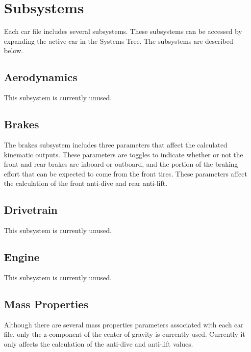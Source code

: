 \section{Subsystems} \label{sec:subsystems}

Each car file includes several subsystems.  These subsystems can be accessed by expanding the active car in the Systems Tree.  The subsystems are described below.

\subsection{Aerodynamics} \label{ssec:aerodynamics}

This subsystem is currently unused.

\subsection{Brakes} \label{ssec:brakes}

The brakes subsystem includes three parameters that affect the calculated kinematic outputs.  These parameters are toggles to indicate whether or not the front and rear brakes are inboard or outboard, and the portion of the braking effort that can be expected to come from the front tires.  These parameters affect the calculation of the front anti-dive and rear anti-lift.

\subsection{Drivetrain} \label{ssec:drivetrain}

This subsystem is currently unused.

\subsection{Engine} \label{ssec:engine}

This subsystem is currently unused.

\subsection{Mass Properties} \label{ssec:massProperties}

Although there are several mass properties parameters associated with each car file, only the z-component of the center of gravity is currently used.  Currently it only affects the calculation of the anti-dive and anti-lift values.


